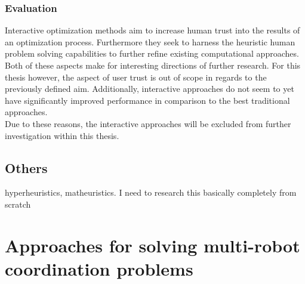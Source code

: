 \subsubsection{Evaluation}

Interactive optimization methods aim to increase human trust into the results of an optimization process. Furthermore they seek to harness the heuristic human problem solving capabilities to further refine existing computational approaches. Both of these aspects make for interesting directions of further research. For this thesis however, the aspect of user trust is out of scope in regards to the previously defined aim. Additionally, interactive approaches do not seem to yet have significantly improved performance in comparison to the best traditional approaches.\\
Due to these reasons, the interactive approaches will be excluded from further investigation within this thesis.

\subsection{Others}\label{sec:others}


hyperheuristics, matheuristics. I need to research this basically completely from scratch

\newpage


\section{Approaches for solving multi-robot coordination problems}\label{sec:mrta-approaches}


